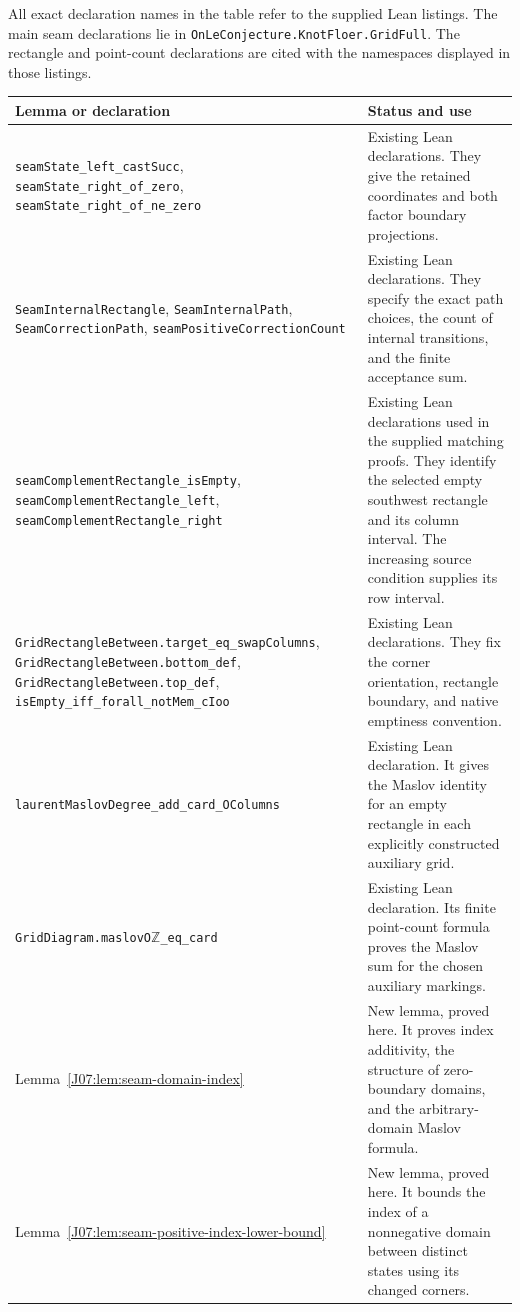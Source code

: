 \documentclass[11pt,oneside]{report}
\theoremstyle{definition}
\numberwithin{equation}{section}
\newcommand{\decl}[1]{\textnormal{\nolinkurl{#1}}}
\begin{document}
All exact declaration names in the table refer to the supplied Lean
listings. The main seam declarations lie in
\decl{OnLeConjecture.KnotFloer.GridFull}.
The rectangle and point-count declarations are cited with the
namespaces displayed in those listings.

\small
\begin{longtable}{p{}p{}}
\toprule
Lemma or declaration & Status and use \\
\midrule
\endhead
\decl{seamState_left_castSucc},
\decl{seamState_right_of_zero},
\decl{seamState_right_of_ne_zero}
& Existing Lean declarations. They give the retained coordinates and
both factor boundary projections. \\
\decl{SeamInternalRectangle}, \decl{SeamInternalPath},
\decl{SeamCorrectionPath}, \decl{seamPositiveCorrectionCount}
& Existing Lean declarations. They specify the exact path choices,
the count of internal transitions, and the finite acceptance sum. \\
\decl{seamComplementRectangle_isEmpty},
\decl{seamComplementRectangle_left},
\decl{seamComplementRectangle_right}
& Existing Lean declarations used in the supplied matching proofs.
They identify the selected empty southwest rectangle and its column
interval. The increasing source condition supplies its row interval. \\
\decl{GridRectangleBetween.target_eq_swapColumns},
\decl{GridRectangleBetween.bottom_def},
\decl{GridRectangleBetween.top_def},
\decl{isEmpty_iff_forall_notMem_cIoo}
& Existing Lean declarations. They fix the corner orientation,
rectangle boundary, and native emptiness convention. \\
\decl{laurentMaslovDegree_add_card_OColumns}
& Existing Lean declaration. It gives the Maslov identity for an empty
rectangle in each explicitly constructed auxiliary grid. \\
\decl{GridDiagram.maslovO}\ensuremath{\mathbb Z}\decl{_eq_card}
& Existing Lean declaration. Its finite point-count formula proves the Maslov sum for the
chosen auxiliary markings. \\
Lemma~\ref{J07:lem:seam-domain-index}
& New lemma, proved here. It proves index additivity, the structure of
zero-boundary domains, and the arbitrary-domain Maslov formula. \\
Lemma~\ref{J07:lem:seam-positive-index-lower-bound}
& New lemma, proved here. It bounds the index of a nonnegative domain
between distinct states using its changed corners. \\

\end{longtable}
\end{document}

